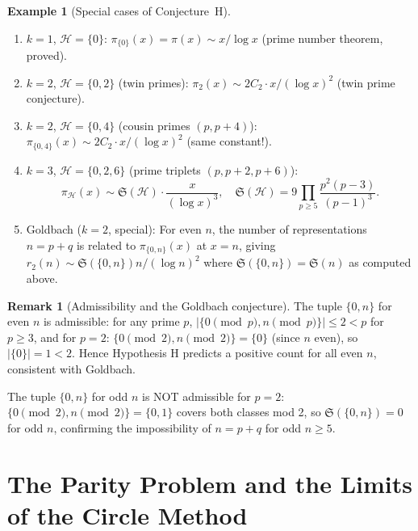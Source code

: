 \documentclass[12pt,a4paper]{amsart}
\theoremstyle{definition}
\newtheorem{remark}[theorem]{Remark}
\newtheorem{example}[theorem]{Example}
\begin{document}
\begin{example}[Special cases of Conjecture~H]
  \begin{enumerate}
    \item $k = 1$, $\mathcal{H} = \{0\}$:
      $\pi_{\{0\}}(x) = \pi(x) \sim x/\log x$ (prime number theorem, proved).
    \item $k = 2$, $\mathcal{H} = \{0, 2\}$ (twin primes):
      $\pi_2(x) \sim 2C_2 \cdot x/(\log x)^2$ (twin prime conjecture).
    \item $k = 2$, $\mathcal{H} = \{0, 4\}$ (cousin primes $(p, p+4)$):
      $\pi_{\{0,4\}}(x) \sim 2C_2 \cdot x/(\log x)^2$ (same constant!).
    \item $k = 3$, $\mathcal{H} = \{0, 2, 6\}$ (prime triplets $(p,p+2,p+6)$):
      \[
        \pi_{\mathcal{H}}(x) \sim \mathfrak{S}(\mathcal{H}) \cdot \frac{x}{(\log x)^3},
        \quad \mathfrak{S}(\mathcal{H}) = 9 \prod_{p \geq 5} \frac{p^2(p-3)}{(p-1)^3}.
      \]
    \item Goldbach ($k=2$, special): For even $n$, the number of
      representations $n = p + q$ is related to $\pi_{\{0, n\}}(x)$
      at $x = n$, giving $r_2(n) \sim \mathfrak{S}(\{0,n\}) n/(\log n)^2$
      where $\mathfrak{S}(\{0,n\}) = \mathfrak{S}(n)$ as computed above.
  \end{enumerate}
\end{example}

\begin{remark}[Admissibility and the Goldbach conjecture]
  The tuple $\{0, n\}$ for even $n$ is admissible: for any prime $p$,
  $|\{0 \pmod p, n \pmod p\}| \leq 2 < p$ for $p \geq 3$, and for
  $p = 2$: $\{0 \pmod 2, n \pmod 2\} = \{0\}$ (since $n$ even), so
  $|\{0\}| = 1 < 2$.  Hence Hypothesis H predicts a positive count
  for all even $n$, consistent with Goldbach.

  The tuple $\{0, n\}$ for odd $n$ is NOT admissible for $p = 2$:
  $\{0 \pmod 2, n \pmod 2\} = \{0, 1\}$ covers both classes mod 2,
  so $\mathfrak{S}(\{0,n\}) = 0$ for odd $n$, confirming the
  impossibility of $n = p + q$ for odd $n \geq 5$.
\end{remark}

\section{The Parity Problem and the Limits of the Circle Method}
\label{sec:parity}
\end{document}

